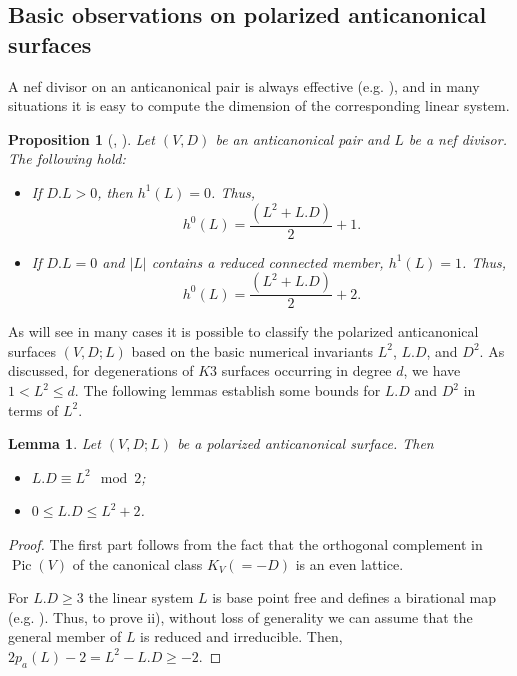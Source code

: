\documentclass{amsart}
\numberwithin{equation}{section}
\theoremstyle{plain}
\newtheorem{lemma}[equation]{Lemma}
\newtheorem{proposition}[equation]{Proposition}
\theoremstyle{remark}
\theoremstyle{definition}
\def\Pic{\operatorname{Pic}}
\begin{document}
\subsection{Basic observations on polarized anticanonical surfaces} A nef divisor on an anticanonical pair is  always effective (e.g. \cite[Cor. 2.3]{har2}), and in many situations it is easy to compute the dimension of the corresponding linear system. 
\begin{proposition}[{\cite[Lemma 5]{friedmanlin}, \cite[Thm. I.1]{har1}}]\label{proprr}
Let $(V,D)$ be an anticanonical pair and $L$ be a nef divisor. The following hold:
\begin{itemize}
\item[a)] If $D.L>0$, then $h^1(L)=0$. Thus, 
$$h^0(L)=\frac{(L^2+L.D)}{2}+1.$$
\item[b)] If $D.L=0$ and $|L|$ contains a reduced connected member, $h^1(L)=1$.  Thus,
$$h^0(L)=\frac{(L^2+L.D)}{2}+2.$$
\end{itemize}
\end{proposition}


As will see in many cases it is possible to classify the polarized anticanonical surfaces $(V,D;L)$ based on the  basic  numerical invariants $L^2$, $L.D$, and $D^2$. As discussed, for degenerations of $K3$ surfaces occurring in degree $d$, we have $1<L^2\le d$.  The following lemmas establish some 
 bounds for $L.D$ and $D^2$ in terms of $L^2$. 
\begin{lemma}\label{lbound1}
Let $(V,D;L)$ be a polarized anticanonical surface. Then
\begin{itemize}
\item[i)] $L.D\equiv L^2 \mod 2$;
\item[ii)] $0\le L.D\le L^2+2$.
\end{itemize} 
\end{lemma}
\begin{proof}
The first part follows from the fact that the orthogonal complement in $\Pic(V)$ of the canonical class $K_V(=-D)$ is an even lattice. 

For $L.D\ge 3$ the linear system $L$ is base point free and defines a birational map (e.g. \cite[Prop. 3.2]{har2}). Thus, to prove ii), without loss of generality we can assume  that the general member of $L$ is reduced and irreducible. Then, $2p_a(L)-2=L^2-L.D\ge -2.$
\end{proof}
\end{document}
